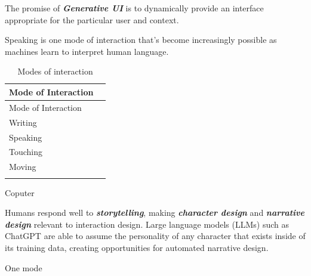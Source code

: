 \documentclass[
  letterpaper,
  DIV=11,
  numbers=noendperiod]{scrartcl}
\begin{document}
The promise of \textbf{\emph{Generative UI}} is to dynamically provide
an interface appropriate for the particular user and context.

Speaking is one mode of interaction that's become increasingly possible
as machines learn to interpret human language.

\begin{longtable}[]{@{}ll@{}}
\caption{Modes of interaction}\tabularnewline
\toprule\noalign{}
Mode of Interaction & \\
\midrule\noalign{}
\endfirsthead
\toprule\noalign{}
Mode of Interaction & \\
\midrule\noalign{}
\endhead
\bottomrule\noalign{}
\endlastfoot
Writing & \\
Speaking & \\
Touching & \\
Moving & \\
& \\
\end{longtable}

Coputer

Humans respond well to \textbf{\emph{storytelling}}, making
\textbf{\emph{character design}} and \textbf{\emph{narrative design}}
relevant to interaction design. Large language models (LLMs) such as
ChatGPT are able to assume the personality of any character that exists
inside of its training data, creating opportunities for automated
narrative design.

One mode
\end{document}
